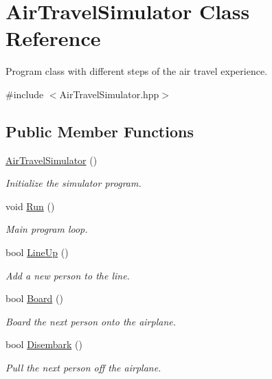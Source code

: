 \hypertarget{classAirTravelSimulator}{}\section{Air\+Travel\+Simulator Class Reference}
\label{classAirTravelSimulator}


Program class with different steps of the air travel experience.  




{\ttfamily \#include $<$Air\+Travel\+Simulator.\+hpp$>$}

\subsection*{Public Member Functions}
\begin{DoxyCompactItemize}
\item 
\hyperlink{classAirTravelSimulator_a2e62e2a182531b5077080af66fc45268}{Air\+Travel\+Simulator} ()
\begin{DoxyCompactList}\small\item\em Initialize the simulator program. \end{DoxyCompactList}\item 
void \hyperlink{classAirTravelSimulator_a816bdf99f56fbc05cbffac921e0a6df0}{Run} ()
\begin{DoxyCompactList}\small\item\em Main program loop. \end{DoxyCompactList}\item 
bool \hyperlink{classAirTravelSimulator_a1fd8d540a708615996068b91d810fbd2}{Line\+Up} ()
\begin{DoxyCompactList}\small\item\em Add a new person to the line. \end{DoxyCompactList}\item 
bool \hyperlink{classAirTravelSimulator_a73c18883082ca7c1f4be8026c4c4c694}{Board} ()
\begin{DoxyCompactList}\small\item\em Board the next person onto the airplane. \end{DoxyCompactList}\item 
bool \hyperlink{classAirTravelSimulator_a3714d744cdebd72838e3899f35efd513}{Disembark} ()
\begin{DoxyCompactList}\small\item\em Pull the next person off the airplane. \end{DoxyCompactList}\item 

\end{DoxyCompactItemize}
